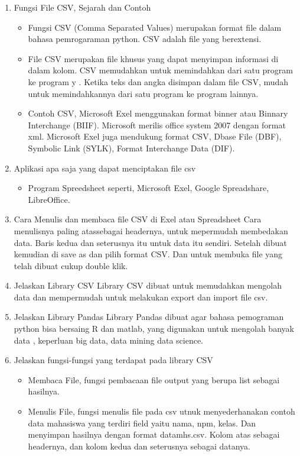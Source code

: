 \begin{enumerate}
\item Fungsi File CSV, Sejarah dan Contoh
\begin{itemize}
    \item Fungsi CSV (Comma Separated Values) merupakan format file dalam bahasa pemrogaraman python. CSV adalah file yang berextensi.
    \item File CSV merupakan file khusus yang dapat menyimpan informasi di dalam kolom. CSV memudahkan untuk memindahkan dari satu program ke program y .  Ketika teks dan angka disimpan dalam file CSV, mudah untuk memindahkannya dari satu program ke program lainnya.
    \item Contoh CSV, Microsoft Exel menggunakan format binner atau Binnary Interchange (BIIF). Microsoft merilis office system 2007 dengan format xml. Microsoft Exel juga mendukung format CSV, Dbase File (DBF), Symbolic Link (SYLK), Format Interchange Data (DIF).
\end{itemize}

\item Aplikasi apa saja yang dapat menciptakan file csv
\begin{itemize}
    \item Program Spreedsheet seperti, Microsoft Exel, Google Spreadshare, LibreOffice.
\end{itemize}

\item Cara Menulis dan membaca file CSV di Exel atau Spreadsheet
Cara menulisnya paling atassebagai headernya, untuk mepermudah membedakan data. Baris kedua dan seterusnya itu untuk data itu sendiri. Setelah dibuat kemudian di save as dan pilih format CSV. Dan untuk membuka file yang telah dibuat cukup double klik.

\item Jelaskan Library CSV
Library CSV dibuat untuk memudahkan mengolah data dan mempermudah untuk melakukan export dan import file csv.

\item Jelaskan Library Pandas
Library Pandas dibuat agar bahasa pemograman python bisa bersaing R dan matlab, yang digunakan untuk mengolah banyak data , keperluan big data, data mining data science.

\item Jelaskan fungsi-fungsi yang terdapat pada library CSV
\begin{itemize}
    \item Membaca File, fungsi pembacaan file output yang berupa list sebagai hasilnya.
    \item Menulis File, fungsi menulis file pada csv utnuk menyederhanakan contoh data mahasiswa yang terdiri field yaitu nama, npm, kelas. Dan menyimpan hasilnya dengan format datamhs.csv. Kolom atas sebagai headernya, dan kolom kedua dan seterusnya sebagai datanya.
\end{itemize}


\end{enumerate}
